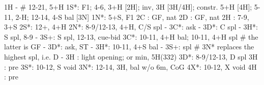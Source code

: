 1H -  # 12-21, 5+H
1S*: F1; 4-6, 3+H [2H]; inv, 3H [3H/4H]; constr. 5+H [4H]; 5-11, 2-H; 12-14, 4-S bal [3N]
1N*: 5+S, F1
2C : GF, nat
2D : GF, nat
2H : 7-9, 3+S
2S*: 12+, 4+H
2N*: 8-9/12-13, 4+H, C/S spl
   - 3C*: ask
        - 3D*: C spl
        - 3H*: S spl, 8-9
        - 3S+: S spl, 12-13, cue-bid
3C*: 10-11, 4+H bal; 10-11, 4+H spl  # the latter is GF
   - 3D*: ask, ST
        - 3H*: 10-11, 4+S bal
        - 3S+: spl  # 3N* replaces the highest spl, i.e. D
   - 3H : light opening; or min, 5H(332)
3D*: 8-9/12-13, D spl
3H : pre
3S*: 10-12, S void
3N*: 12-14, 3H, bal w/o 6m, CoG
4X*: 10-12, X void
4H : pre